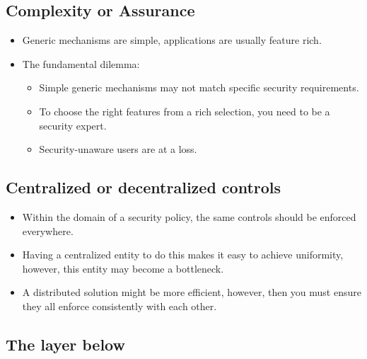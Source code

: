 \documentclass{beamer}
\begin{document}
\subsection{Complexity or Assurance}

\begin{frame}
  \begin{itemize}
    \item Generic mechanisms are simple, applications are usually feature rich.

    \item The fundamental dilemma:
      \begin{itemize}
        \item Simple generic mechanisms may not match specific security 
          requirements.

        \item To choose the right features from a rich selection, you need to 
          be a security expert.

        \item Security-unaware users are at a loss.
      \end{itemize}
  \end{itemize}
\end{frame}

\subsection{Centralized or decentralized controls}

\begin{frame}
  \begin{itemize}
    \item Within the domain of a security policy, the same controls should be 
      enforced everywhere.

    \item Having a centralized entity to do this makes it easy to achieve 
      uniformity, however, this entity may become a bottleneck.

    \item A distributed solution might be more efficient, however, then you 
      must ensure they all enforce consistently with each other.
  \end{itemize}
\end{frame}

\subsection{The layer below}
\end{document}
